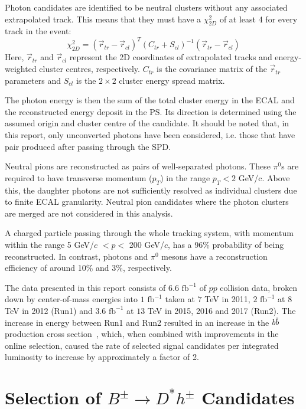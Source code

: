 \documentclass[oneside,12pt]{article}
\newcommand{\overbar}[1]{\mkern 1.5mu\overline{\mkern-1.5mu#1\mkern-1.5mu}\mkern
1.5mu}
\begin{document}
Photon candidates are identified to be neutral clusters without any associated
extrapolated track. This means that they must have a $\chi^2_{2D}$ of at least 4
for every track in the event:
\begin{equation}
  \chi^2_{2D}=(\vec{r}_{tr}-\vec{r}_{cl})^T(C_{tr}+S_{cl})^{-1}(\vec{r}_{tr}-\vec{r}_{cl})
  \label{Chi2}
\end{equation}
\noindent Here, $\vec{r}_{tr}$ and $\vec{r}_{cl}$ represent the 2D coordinates
of extrapolated tracks and energy-weighted cluster centres, respectively.
$C_{tr}$ is the covariance matrix of the $\vec{r}_{tr}$ parameters and $S_{cl}$
is the $2 \times 2$ cluster energy spread matrix.  

The photon energy is then the sum of the total cluster energy in the ECAL and
the reconstructed energy deposit in the PS. Its direction is determined using
the assumed origin and cluster centre of the candidate. It should be noted that,
in this report, only unconverted photons have been considered, i.e. those that
have pair produced after passing through the SPD.

Neutral pions are reconstructed as pairs of well-separated photons. These
$\pi^0$s are required to have transverse momentum ($p_T$) in the range $p_{T}<2$
GeV/c.  Above this, the daughter photons are not sufficiently resolved as
individual clusters due to finite ECAL granularity. Neutral pion candidates
where the photon clusters are merged are not considered in this analysis.

A charged particle passing through the whole tracking system, with momentum
within the range 5 GeV/$c$ $< p <$ 200 GeV/$c$, has a 96\% probability of being
reconstructed. In contrast, photons and $\pi^0$ mesons have a reconstruction
efficiency of around 10\% and 3\%, respectively.

The data presented in this report consists of $6.6$ $\text{fb}^{-1}$ of $pp$
collision data, broken down by center-of-mass energies into $1$ $\text{fb}^{-1}$ taken at $7$ TeV in 2011, $2$
$\text{fb}^{-1}$ at $8$ TeV in 2012 (Run1) and $3.6$ $\text{fb}^{-1}$ at $13$
TeV in 2015, 2016 and 2017 (Run2). The increase in energy between Run1 and Run2
resulted in an increase in the $b\overbar{b}$ production cross
section~\cite{PDG2018}, which, when combined with improvements in the online
selection, caused the rate of selected signal candidates per integrated
luminosity to increase by approximately a factor of 2.

\vspace{-3mm}
\section{Selection of $B^{\pm}\rightarrow D^*h^{\pm}$ Candidates} \label{sec:selections}
\end{document}
